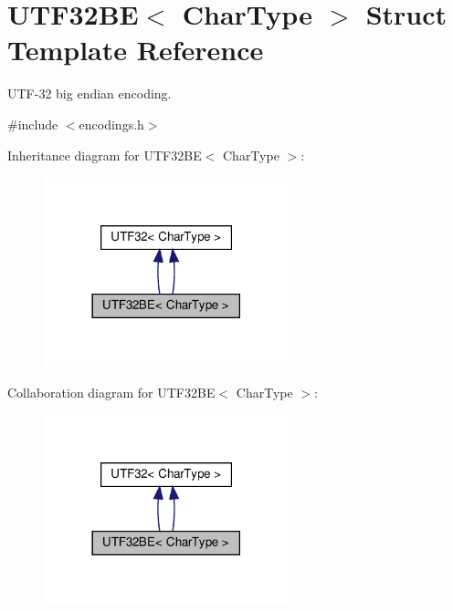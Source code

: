 \hypertarget{structUTF32BE}{}\section{U\+T\+F32\+BE$<$ Char\+Type $>$ Struct Template Reference}
\label{structUTF32BE}


U\+T\+F-\/32 big endian encoding.  




{\ttfamily \#include $<$encodings.\+h$>$}



Inheritance diagram for U\+T\+F32\+BE$<$ Char\+Type $>$\+:
\nopagebreak
\begin{figure}[H]
\begin{center}
\leavevmode
\includegraphics[width=201pt]{structUTF32BE__inherit__graph}
\end{center}
\end{figure}


Collaboration diagram for U\+T\+F32\+BE$<$ Char\+Type $>$\+:
\nopagebreak
\begin{figure}[H]
\begin{center}
\leavevmode
\includegraphics[width=201pt]{structUTF32BE__coll__graph}
\end{center}
\end{figure}
